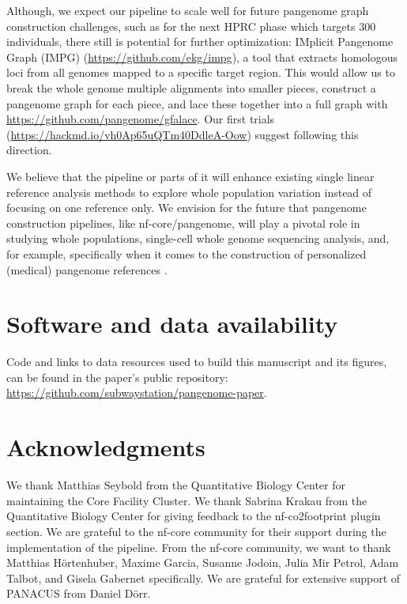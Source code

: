 \documentclass{bioinfo}
\theoremstyle{definition}
\begin{document}
	Although, we expect our pipeline to scale well for future pangenome graph construction challenges, such as for the next HPRC phase which targets 300 individuals, there still is potential for further optimization: 
	IMplicit Pangenome Graph (IMPG) (\href{https://github.com/ekg/impg}{https://github.com/ekg/impg}), a tool that extracts homologous loci from all genomes mapped to a specific target region. 
	This would allow us to break the whole genome multiple alignments into smaller pieces, construct a pangenome graph for each piece, and lace these together into a full graph with \href{https://github.com/pangenome/gfalace}{https://github.com/pangenome/gfalace}. 
	Our first trials (\href{https://hackmd.io/vh0Ap65uQTm40DdleA-Oow}{https://hackmd.io/vh0Ap65uQTm40DdleA-Oow}) suggest following this direction.
	
	We believe that the pipeline or parts of it will enhance existing single linear reference analysis methods to explore whole population variation instead of focusing on one reference only. We envision for the future that pangenome construction pipelines, like nf-core/pangenome, will play a pivotal role in studying whole populations, single-cell whole genome sequencing analysis, and, for example, specifically when it comes to the construction of personalized (medical) pangenome references \citep{Sirn2023}. 
	
	
	\section*{Software and data availability}
	
	Code and links to data resources used to build this manuscript and its figures, can be found in the paper’s public repository: \href{https://github.com/subwaystation/pangenome-paper}{https://github.com/subwaystation/pangenome-paper}.

	\section*{Acknowledgments}

	We thank Matthias Seybold from the Quantitative Biology Center for
	maintaining the Core Facility Cluster. 
	We thank Sabrina Krakau from the Quantitative Biology Center for giving feedback to the nf-co2footprint plugin section. 
	We are grateful to the nf-core community for their support during the implementation of the pipeline. 
	From the nf-core community, we want to thank Matthias Hörtenhuber, Maxime Garcia, Susanne Jodoin, Julia Mir Petrol, Adam Talbot, and Gisela Gabernet specifically. 
	We are grateful for extensive support of PANACUS from Daniel Dörr.
\end{document}
